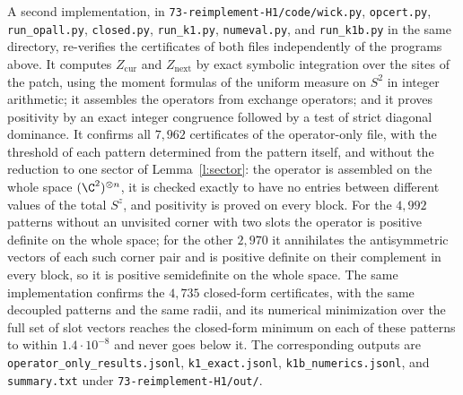 A second implementation, in \texttt{73-\allowbreak reimplement-\allowbreak H1/\allowbreak code/\linebreak[1]wick.py}, \texttt{opcert.py}, \texttt{run\_\allowbreak opall.py}, \texttt{closed.py}, \texttt{run\_\allowbreak k1.py}, \texttt{numeval.py}, and \texttt{run\_\allowbreak k1b.py} in the same directory, re-verifies the certificates of both files independently of the programs above. It computes $Z_{\mathrm{cur}}$ and $Z_{\mathrm{next}}$ by exact symbolic integration over the sites of the patch, using the moment formulas of the uniform measure on $S^2$ in integer arithmetic; it assembles the operators from exchange operators; and it proves positivity by an exact integer congruence followed by a test of strict diagonal dominance. It confirms all $7{, }962$ certificates of the operator-only file, with the threshold of each pattern determined from the pattern itself, and without the reduction to one sector of Lemma~\ref{l:sector}: the operator is assembled on the whole space $(\C^2)^{\otimes n}$, it is checked exactly to have no entries between different values of the total $S^z$, and positivity is proved on every block. For the $4{, }992$ patterns without an unvisited corner with two slots the operator is positive definite on the whole space; for the other $2{, }970$ it annihilates the antisymmetric vectors of each such corner pair and is positive definite on their complement in every block, so it is positive semidefinite on the whole space. The same implementation confirms the $4{, }735$ closed-form certificates, with the same decoupled patterns and the same radii, and its numerical minimization over the full set of slot vectors reaches the closed-form minimum on each of these patterns to within $1.4 \cdot 10^{-8}$ and never goes below it. The corresponding outputs are \texttt{operator\_\allowbreak only\_\allowbreak results.jsonl}, \texttt{k1\_\allowbreak exact.jsonl}, \texttt{k1b\_\allowbreak numerics.jsonl}, and \texttt{summary.txt} under \texttt{73-\allowbreak reimplement-\allowbreak H1/\allowbreak out/\allowbreak }.

